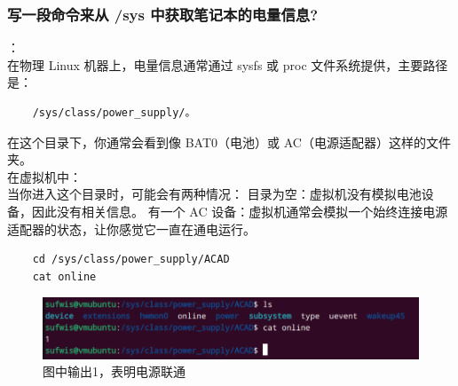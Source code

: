 \documentclass[UTF8]{ctexart}
\begin{document}
\subsubsection{写一段命令来从 /sys 中获取笔记本的电量信息?}
：\\
在物理 Linux 机器上，电量信息通常通过 sysfs 或 proc 文件系统提供，主要路径是：
\begin{verbatim}
	/sys/class/power_supply/。
\end{verbatim}
在这个目录下，你通常会看到像 BAT0（电池）或 AC（电源适配器）这样的文件夹。\\
在虚拟机中：\\
当你进入这个目录时，可能会有两种情况：
目录为空：虚拟机没有模拟电池设备，因此没有相关信息。
有一个 AC 设备：虚拟机通常会模拟一个始终连接电源适配器的状态，让你感觉它一直在通电运行。\\
\begin{lstlisting}
	cd /sys/class/power_supply/ACAD
	cat online
\end{lstlisting}
\begin{figure}[H]
	\centering
	\includegraphics[width=0.7\linewidth]{figures/online.png}
	\caption{图中输出1，表明电源联通}
\end{figure}
\end{document}
